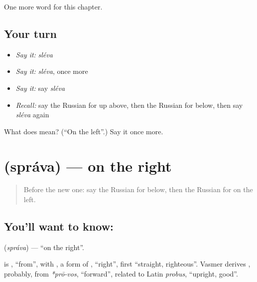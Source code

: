 \begin{grammarlens}[title={What you've built}]
One more word for this chapter.
\end{grammarlens}

\subsection*{Your turn}
\begin{itemize}
\raggedright
  \item \emph{Say it:} \emph{sléva}
  \item \emph{Say it:} \emph{sléva}, once more
  \item \emph{Say it:} say \emph{sléva}
  \item \emph{Recall:} say the Russian for up above, then the Russian for below, then say \emph{sléva} again
\end{itemize}

\begin{tcolorbox}[breakable,colback=teal!4,colframe=teal!35!black,title={Before you move on}]
What does  mean? (\textquotedblleft{}On the left\textquotedblright{}.) Say it once more.
\end{tcolorbox}
\section[\texorpdfstring{\ru{справа} (správa)}{справа (správa)}]{ (správa) — on the right}

\label{lesson:RU-C73-right}



\begin{quote}
Before the new one: say the Russian for below, then the Russian for on the left.
\end{quote}

\subsection*{You'll want to know: }
\textbf{} (\emph{správa}) — \textquotedblleft{}on the right\textquotedblright{}.

\begin{cousinweb}
\textbf{} is \emph{}, \textquotedblleft{}from\textquotedblright{}, with \emph{}, a form of \emph{}, \textquotedblleft{}right\textquotedblright{}, first \textquotedblleft{}straight, righteous\textquotedblright{}. Vasmer derives \emph{}, probably, from \emph{*prō-vos}, \textquotedblleft{}forward\textquotedblright{}, related to Latin \emph{probus}, \textquotedblleft{}upright, good\textquotedblright{}.
\end{cousinweb}

